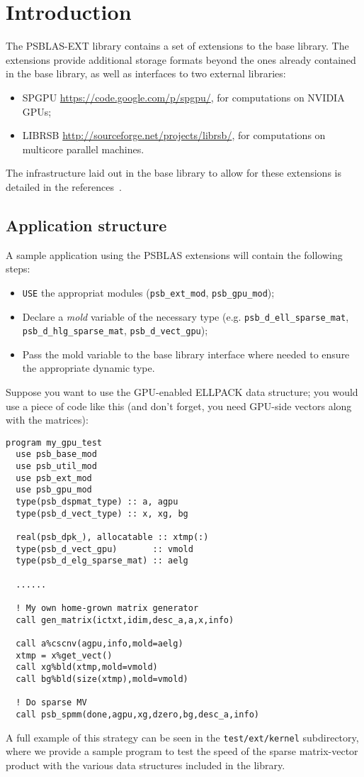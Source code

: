 \section{Introduction}\label{sec:intro}

The PSBLAS-EXT  library contains a set of extensions to the base
library. The extensions provide additional storage formats beyond the
 ones already contained in the base library, as well as interfaces to
 two external libraries:
\begin{itemize}
\item SPGPU \url{https://code.google.com/p/spgpu/}, for computations on
  NVIDIA GPUs;
\item LIBRSB \url{http://sourceforge.net/projects/librsb/}, for
  computations on multicore parallel machines. 
\end{itemize}
The infrastructure laid out in the base library to allow for these
extensions is detailed in the references~\cite{CaFiRo:14,Sparse03}. 


\subsection{Application structure}
\label{sec:appstruct}
A sample application using the PSBLAS extensions will contain the
following steps:
\begin{itemize}
\item \verb|USE| the appropriat modules (\verb|psb_ext_mod|,
  \verb|psb_gpu_mod|);
\item Declare a \emph{mold} variable of the necessary type
  (e.g. \verb|psb_d_ell_sparse_mat|, \verb|psb_d_hlg_sparse_mat|,
  \verb|psb_d_vect_gpu|);
\item Pass the mold variable to the base library interface where
  needed to ensure the appropriate dynamic type.
\end{itemize}
Suppose you want to use the GPU-enabled ELLPACK data structure; you
would use a piece of code like this (and don't forget, you need
GPU-side vectors along with the matrices):
\lstset{language=Fortran}
\begin{lstlisting}
program my_gpu_test
  use psb_base_mod
  use psb_util_mod 
  use psb_ext_mod
  use psb_gpu_mod
  type(psb_dspmat_type) :: a, agpu
  type(psb_d_vect_type) :: x, xg, bg

  real(psb_dpk_), allocatable :: xtmp(:)
  type(psb_d_vect_gpu)       :: vmold
  type(psb_d_elg_sparse_mat) :: aelg

  ......  

  ! My own home-grown matrix generator
  call gen_matrix(ictxt,idim,desc_a,a,x,info)
  
  call a%cscnv(agpu,info,mold=aelg)
  xtmp = x%get_vect() 
  call xg%bld(xtmp,mold=vmold)
  call bg%bld(size(xtmp),mold=vmold)
  
  ! Do sparse MV
  call psb_spmm(done,agpu,xg,dzero,bg,desc_a,info)
\end{lstlisting}
A full example of this strategy can be seen in the
\verb|test/ext/kernel| subdirectory, where we provide a sample program
to test the speed of the sparse matrix-vector product with the various
data structures included in the library. 





